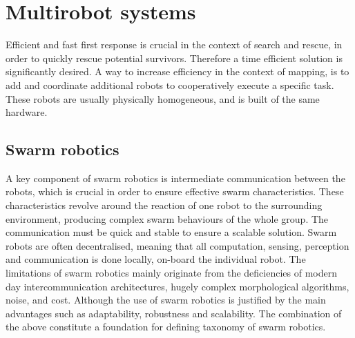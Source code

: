 \section{Multirobot systems}\label{sec:Swarm_Robotics}
Efficient and fast first response is crucial in the context of search and rescue, in order to quickly rescue potential survivors. Therefore a time efficient solution is significantly desired. A way to increase efficiency in the context of mapping, is to add and coordinate additional robots to cooperatively execute a specific task. These robots are usually physically homogeneous, and is built of the same hardware. 







\subsection{Swarm robotics}
 A key component of swarm robotics is intermediate communication between the robots, which is crucial in order to ensure effective swarm characteristics. These characteristics revolve around the reaction of one robot to the surrounding environment, producing complex swarm behaviours of the whole group. The communication must be quick and stable to ensure a scalable solution. Swarm robots are often decentralised, meaning that all computation, sensing, perception and communication is done locally, on-board the individual robot. The limitations of swarm robotics mainly originate from the deficiencies of modern day intercommunication architectures, hugely complex morphological algorithms, noise, and cost. Although the use of swarm robotics is justified by the main advantages such as adaptability, robustness and scalability. The combination of the above constitute a foundation for defining taxonomy of swarm robotics. \cite{Swarm:SwarmRobotics,Swarm:BehaviourAndApplications}
 
